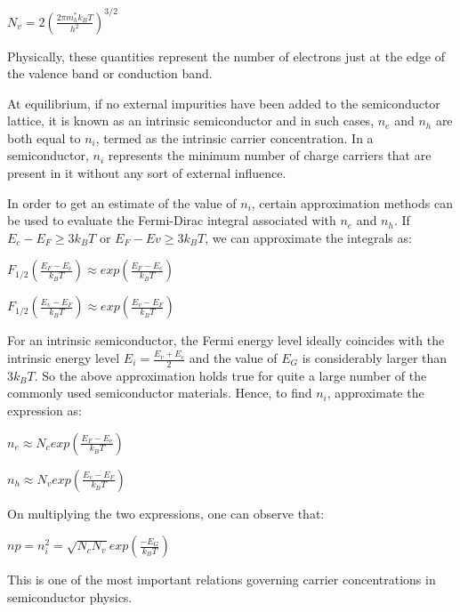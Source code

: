 \documentclass[12 pt]{article}
\begin{document}
\begin{center}
    $N_{v} = 2(\frac{2\pi m_{h}^{*} k_{B}T}{h^{2}})^{3/2}$
\end{center}
Physically, these quantities represent the number of electrons just at the edge of the valence band or conduction band.\par

At equilibrium, if no external impurities have been added to the semiconductor lattice, it is known as an intrinsic semiconductor and in such cases, $n_{e}$ and $n_{h}$ are both equal to $n_{i}$, termed as the intrinsic carrier concentration. In a semiconductor, $n_{i}$ represents the minimum number of charge carriers that are present in it without any sort of external influence.\par

In order to get an estimate of the value of $n_{i}$, certain approximation methods can be used to evaluate the Fermi-Dirac integral associated with $n_{e}$ and $n_{h}$. If $E_{c}-E_{F} \ge 3k_{B}T$ or $E_{F}-E{v} \ge 3k_{B}T$, we can approximate the integrals as:
\begin{center}
 $F_{1/2}(\frac{E_{F}-E_{c}}{k_{B}T}) \approx exp(\frac{E_{F}-E_{c}}{k_{B}T}) $
\end{center}

\begin{center}
  $F_{1/2}(\frac{E_{v}-E_{F}}{k_{B}T}) \approx exp(\frac{E_{v}-E_{F}}{k_{B}T})$ 
\end{center}

For an intrinsic semiconductor, the Fermi energy level ideally coincides with the intrinsic energy level $E_{i} = \frac{E_{v}+E_{c}}{2}$ and the value of $E_{G}$ is considerably larger than $3k_{B}T$. So the above approximation holds true for quite a large number of the commonly used semiconductor materials. Hence, to find $n_{i}$, approximate the expression as:
\begin{center}
    $ n_{e} \approx N_{c}exp(\frac{E_{F}-E_{c}}{k_{B}T})  $
\end{center}

\begin{center}
     $ n_{h} \approx N_{v}exp(\frac{E_{v}-E_{F}}{k_{B}T})  $   
\end{center}

On multiplying the two expressions, one can observe that:
\begin{center}
    $np = n_{i}^{2} = \sqrt{N_{c}N_{v}}exp(\frac{-E_{G}}{k_{B}T})  $
\end{center}
This is one of the most important relations governing carrier concentrations in semiconductor physics.
\end{document}
